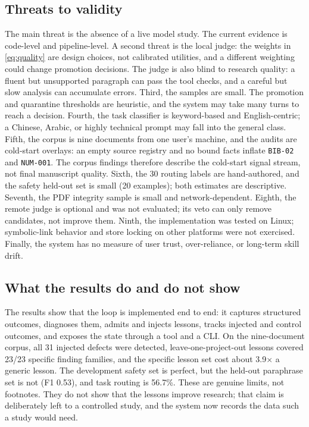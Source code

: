 

\subsection{Threats to validity}
\label{sec:threats}
The main threat is the absence of a live model study. The current evidence is code-level and pipeline-level. A second threat is the local judge: the weights in \cref{eq:quality} are design choices, not calibrated utilities, and a different weighting could change promotion decisions. The judge is also blind to research quality: a fluent but unsupported paragraph can pass the tool checks, and a careful but slow analysis can accumulate errors. Third, the samples are small. The promotion and quarantine thresholds are heuristic, and the system may take many turns to reach a decision. Fourth, the task classifier is keyword-based and English-centric; a Chinese, Arabic, or highly technical prompt may fall into the general class. Fifth, the corpus is nine documents from one user's machine, and the audits are cold-start overlays: an empty source registry and no bound facts inflate \texttt{BIB-02} and \texttt{NUM-001}. The corpus findings therefore describe the cold-start signal stream, not final manuscript quality. Sixth, the 30 routing labels are hand-authored, and the safety held-out set is small (20 examples); both estimates are descriptive. Seventh, the PDF integrity sample is small and network-dependent. Eighth, the remote judge is optional and was not evaluated; its veto can only remove candidates, not improve them. Ninth, the implementation was tested on Linux; symbolic-link behavior and store locking on other platforms were not exercised. Finally, the system has no measure of user trust, over-reliance, or long-term skill drift.

\subsection{What the results do and do not show}
\label{sec:what-results-show}
The results show that the loop is implemented end to end: it captures structured outcomes, diagnoses them, admits and injects lessons, tracks injected and control outcomes, and exposes the state through a tool and a CLI. On the nine-document corpus, all 31 injected defects were detected, leave-one-project-out lessons covered 23/23 specific finding families, and the specific lesson set cost about 3.9$\times$ a generic lesson. The development safety set is perfect, but the held-out paraphrase set is not (F1 0.53), and task routing is 56.7\%. These are genuine limits, not footnotes. They do not show that the lessons improve research; that claim is deliberately left to a controlled study, and the system now records the data such a study would need.
